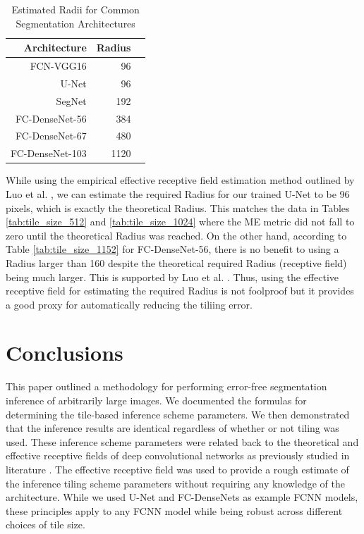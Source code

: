 \documentclass[runningheads]{llncs}
\begin{document}
\begin{table}[h!]
	\centering
	\caption{Estimated Radii for Common Segmentation Architectures}
	\label{tab:common_radii}
	\begin{tabular}{r|r|r}
		Architecture & Radius &  \\ 
		\hline
		FCN-VGG16 \cite{Long2015} & 96 \\
		U-Net \cite{Ronneberger2015a} & 96 \\
		SegNet \cite{Badrinarayanan2015a} & 192 \\
		FC-DenseNet-56 \cite{Jegou2017} & 384 \\
		FC-DenseNet-67 \cite{Jegou2017} & 480 \\
		FC-DenseNet-103 \cite{Jegou2017} & 1120 \\
	\end{tabular}
\end{table}

While using the empirical effective receptive field estimation method outlined by Luo et al. \cite{Luo2016}, we can  estimate the required Radius for our trained U-Net \cite{Ronneberger2015a} to be 96 pixels, which is exactly the theoretical Radius. This matches the data in Tables \ref{tab:tile_size_512} and \ref{tab:tile_size_1024} where the ME metric did not fall to zero until the theoretical Radius was reached. On the other hand, according to Table \ref{tab:tile_size_1152} for FC-DenseNet-56, there is no benefit to using a Radius larger than 160 despite the theoretical required Radius (receptive field) being much larger. This is supported by Luo et al. \cite{Luo2016}. Thus, using the effective receptive field for estimating the required Radius is not foolproof but it provides a good proxy for automatically reducing the tiliing error. 


\section{Conclusions}
\label{conclusion}

This paper outlined a methodology for performing error-free segmentation inference of arbitrarily large images. 
We documented the formulas for determining the tile-based inference scheme parameters. We then demonstrated that the inference results are identical regardless of whether or not tiling was used. These inference scheme parameters were related back to the theoretical and effective receptive fields of deep convolutional networks as previously studied in literature \cite{Luo2016}. The effective receptive field was used to provide a rough estimate of the inference tiling scheme parameters without requiring any knowledge of the architecture.
While we used U-Net and FC-DenseNets as example FCNN models, these principles apply to any FCNN model while being robust across different choices of tile size. 
\end{document}
